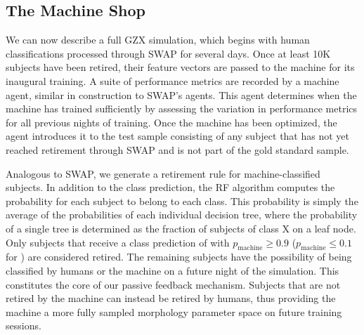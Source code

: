 \subsection{The Machine Shop}\label{chap4: machine shop}
We can now describe a full GZX simulation, which begins with human classifications 
processed through SWAP for several days.   
Once at least 10K subjects have been retired, their feature vectors are passed to 
the machine for its inaugural training. 
A suite of performance metrics are recorded by a machine agent, similar
in construction to SWAP's agents. This agent determines 
when the machine has trained sufficiently by assessing the variation
in performance metrics for all previous nights of training. 
Once the machine has been optimized, the agent introduces it to the test sample
consisting of any subject that has not yet reached retirement through SWAP 
and is not part of the gold standard sample.  

Analogous to SWAP, we generate a retirement rule for machine-classified subjects. 
In addition to the class prediction, the RF algorithm computes the probability for
each subject to belong to each class.  This probability is simply the average of
 the probabilities of each individual decision tree, where the probability of a 
single tree is determined as the fraction of subjects of class X on a leaf node.  
Only subjects that receive a class prediction of \feat with 
$p_{\mathrm{machine}} \ge 0.9$ ($p_{\mathrm{machine}} \le 0.1$ for \notfeat)
are considered retired. 
The remaining subjects have the possibility of being classified by humans 
or the machine on a future night of the simulation. 
This constitutes the core of our passive feedback mechanism. Subjects that are
not retired by the machine can instead be retired by humans, thus providing 
the machine a more fully sampled morphology parameter space on future 
training sessions. 

